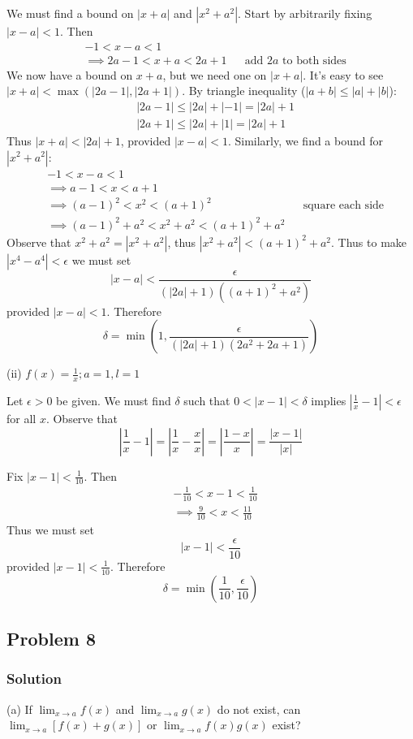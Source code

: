 We must find a bound on $|x+a|$ and $|x^2+a^2|$. Start by arbitrarily fixing $|x-a|<1$. Then
\begin{align*}
    &-1<x-a<1\\
    &\implies 2a-1<x+a<2a+1&&\text{add $2a$ to both sides}
\end{align*}
We now have a bound on $x+a$, but we need one on $|x+a|$. It's easy to see $|x+a|<\max(|2a-1|, |2a+1|)$. By triangle inequality ($|a+b|\leq|a|+|b|$):
\begin{align*}
    &|2a-1|\leq|2a|+|-1|=|2a|+1\\
    &|2a+1|\leq|2a|+|1|=|2a|+1
\end{align*}
Thus $|x+a|<|2a|+1$, provided $|x-a|<1$. Similarly, we find a bound for $|x^2+a^2|$:
\begin{align*}
    &-1<x-a<1\\
    &\implies a-1<x<a+1\\
    &\implies (a-1)^2<x^2<(a+1)^2&&\text{square each side}\\
    &\implies (a-1)^2+a^2<x^2+a^2<(a+1)^2+a^2
\end{align*}
Observe that $x^2+a^2=|x^2+a^2|$, thus $|x^2+a^2|<(a+1)^2+a^2$. Thus to make $|x^4-a^4|<\epsilon$ we must set
\[|x-a|<\frac{\epsilon}{(|2a|+1)((a+1)^2+a^2)}\]
provided $|x-a|<1$. Therefore
\[\delta=\min(1, \frac{\epsilon}{(|2a|+1)(2a^2+2a+1)})\]

\vs

(ii) $f(x)=\frac{1}{x}; a=1, l=1$

\vs

Let $\epsilon>0$ be given. We must find $\delta$ such that $0<|x-1|<\delta$ implies $|\frac{1}{x}-1|<\epsilon$ for all $x$. Observe that
\[\left|\frac{1}{x}-1\right|=\left|\frac{1}{x}-\frac{x}{x}\right|=\left|\frac{1-x}{x}\right|=\frac{|x-1|}{|x|}\]

Fix $|x-1|<\frac{1}{10}$. Then
\begin{align*}
    &-\frac{1}{10}<x-1<\frac{1}{10}\\
    &\implies \frac{9}{10}<x<\frac{11}{10}
\end{align*}
Thus we must set
\[|x-1|<\frac{\epsilon}{10}\] provided $|x-1|<\frac{1}{10}$. Therefore
\[\delta=\min(\frac{1}{10}, \frac{\epsilon}{10})\]

\subsection*{Problem 8}
\subsubsection*{Solution}
(a) If $\lim_{x\to a}f(x)$ and $\lim_{x\to a}g(x)$ do not exist, can $\lim_{x\to a}[f(x)+g(x)]$ or $\lim_{x\to a}f(x)g(x)$ exist?

